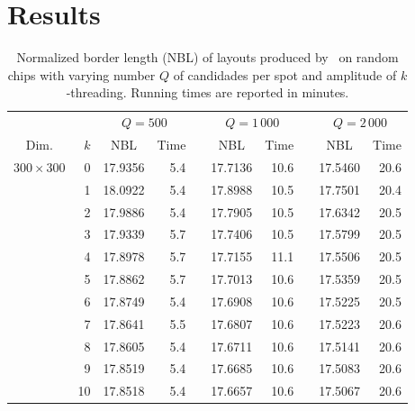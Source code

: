 \section{Results}
\label{sec:merge_results}

\begin{table}[p!]\centering
\caption{\label{tab:greedyplus_nbl}
  Normalized border length (NBL) of layouts produced by \Greedyplus\ on random
  chips with varying number $Q$ of candidades per spot and amplitude of
  $k$-threading. Running times are reported in minutes.}
\footnotesize{
\begin{tabular}{crcrlcrlcr}
\vspace{1pt}
     &     & \multicolumn{2}{c}{$Q=500$} & & \multicolumn{2}{c}{$Q=1\,000$} & & \multicolumn{2}{c}{$Q=2\,000$} \\ \cline{3-4} \cline{6-7} \cline{9-10}
\vspace{1pt}
Dim. & $k$ & NBL & Time & & NBL & Time & & NBL & Time \\
\hline
$300\times 300$ &  0 &      17.9356  &  5.4 &  &      17.7136  & 10.6 &  &      17.5460  &  20.6 \\
                &  1 &      18.0922  &  5.4 &  &      17.8988  & 10.5 &  &      17.7501  &  20.4 \\
                &  2 &      17.9886  &  5.4 &  &      17.7905  & 10.5 &  &      17.6342  &  20.5 \\
                &  3 &      17.9339  &  5.7 &  &      17.7406  & 10.5 &  &      17.5799  &  20.5 \\
                &  4 &      17.8978  &  5.7 &  &      17.7155  & 11.1 &  &      17.5506  &  20.5 \\
                &  5 &      17.8862  &  5.7 &  &      17.7013  & 10.6 &  &      17.5359  &  20.5 \\
                &  6 &      17.8749  &  5.4 &  &      17.6908  & 10.6 &  &      17.5225  &  20.5 \\
                &  7 &      17.8641  &  5.5 &  &      17.6807  & 10.6 &  &      17.5223  &  20.6 \\
                &  8 &      17.8605  &  5.4 &  &      17.6711  & 10.6 &  &      17.5141  &  20.6 \\
                &  9 &      17.8519  &  5.4 &  &      17.6685  & 10.6 &  &      17.5083  &  20.6 \\
                & 10 &      17.8518  &  5.4 &  &      17.6657  & 10.6 &  &      17.5067  &  20.6 \\

\end{tabular}}
\end{table}
